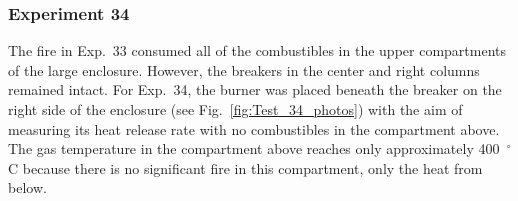 \clearpage

\subsubsection{Experiment 34}

The fire in Exp.~33 consumed all of the combustibles in the upper compartments of the large enclosure. However, the breakers in the center and right columns remained intact. For Exp.~34, the burner was placed beneath the breaker on the right side of the enclosure (see Fig.~\ref{fig:Test_34_photos}) with the aim of measuring its heat release rate with no combustibles in the compartment above. The gas temperature in the compartment above reaches only approximately 400~$^\circ$C because there is no significant fire in this compartment, only the heat from below.

